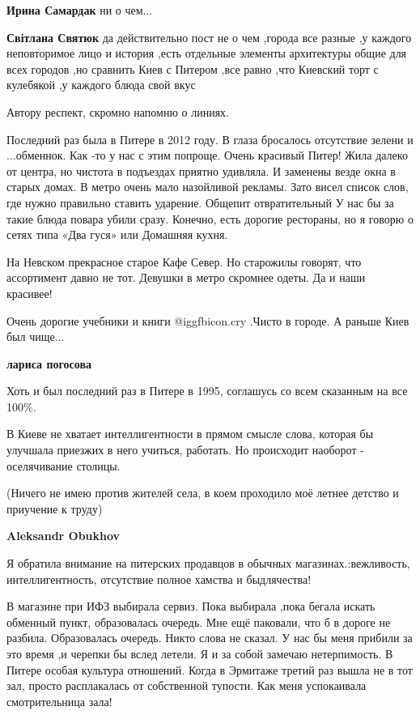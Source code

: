 \begin{itemize}
\begin{itemize} %
\textbf{Ирина Самардак} ни о чем...

\textbf{Світлана Святюк} да действительно пост не о чем ,города все разные ,у каждого неповторимое лицо и история ,есть отдельные элементы архитектуры общие для всех городов ,но сравнить Киев с Питером ,все равно ,что Киевский торт с кулебякой ,у каждого блюда свой вкус
\end{itemize} %

Автору респект, скромно напомню о линиях.


Последний раз была в Питере в 2012 году. В глаза бросалось отсутствие зелени и
...обменнок. Как -то у нас с этим попроще. Очень красивый Питер! Жила далеко от
центра, но чистота в подъездах приятно удивляла. И заменены везде окна в старых
домах. В метро очень мало назойливой рекламы. Зато висел список слов, где нужно
правильно ставить ударение. Общепит отвратительный У нас бы за такие блюда
повара убили сразу. Конечно, есть дорогие рестораны, но я говорю о сетях типа «Два
гуся» или Домашняя кухня.

На Невском прекрасное старое Кафе Север. Но старожилы говорят, что ассортимент
давно не тот. Девушки в метро скромнее одеты. Да и наши красивее!

Очень дорогие учебники и книги @igg{fbicon.cry} .Чисто в городе. А раньше Киев был чище...

\begin{itemize} %
\textbf{лариса погосова}

Хоть и был последний раз в Питере в 1995, соглашусь со всем сказанным на все 100\%.

В Киеве не хватает интеллигентности в прямом смысле слова, которая бы улучшала
приезжих в него учиться, работать. Но происходит наоборот - оселячивание
столицы.

(Ничего не имею против жителей села, в коем проходило моё летнее детство и
приучение к труду)

\begin{itemize} %
\textbf{Aleksandr Obukhov}

Я обратила внимание на питерских продавцов в обычных
магазинах.:вежливость, интеллигентность, отсутствие полное хамства и быдлячества!

В магазине при ИФЗ выбирала сервиз. Пока выбирала ,пока бегала искать обменный
пункт, образовалась очередь. Мне ещё паковали, что б в дороге не
разбила. Образовалась очередь. Никто слова не сказал. У нас бы меня прибили за это
время ,и черепки бы вслед летели. Я и за собой замечаю нетерпимость. В Питере
особая культура отношений. Когда в Эрмитаже третий раз вышла не в тот зал, просто
расплакалась от собственной тупости. Как меня успокаивала смотрительница зала!


\end{itemize}
\end{itemize}
\end{itemize}
